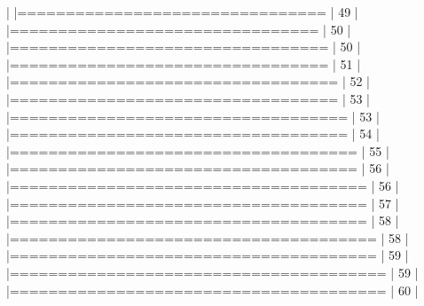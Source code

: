 \documentclass[10pt]{article}
\newenvironment{CodeChunk}{}{}
\begin{document}
\begin{CodeChunk}
\begin{CodeChunk}
\begin{CodeOutput}
  |                                                                       
  |================================                                 |  49%
  |                                                                       
  |================================                                 |  50%
  |                                                                       
  |=================================                                |  50%
  |                                                                       
  |=================================                                |  51%
  |                                                                       
  |==================================                               |  52%
  |                                                                       
  |==================================                               |  53%
  |                                                                       
  |===================================                              |  53%
  |                                                                       
  |===================================                              |  54%
  |                                                                       
  |====================================                             |  55%
  |                                                                       
  |====================================                             |  56%
  |                                                                       
  |=====================================                            |  56%
  |                                                                       
  |=====================================                            |  57%
  |                                                                       
  |=====================================                            |  58%
  |                                                                       
  |======================================                           |  58%
  |                                                                       
  |======================================                           |  59%
  |                                                                       
  |=======================================                          |  59%
  |                                                                       
  |=======================================                          |  60%
  |                                                                       

\end{CodeOutput}
\end{CodeChunk}
\end{CodeChunk}
\end{document}
